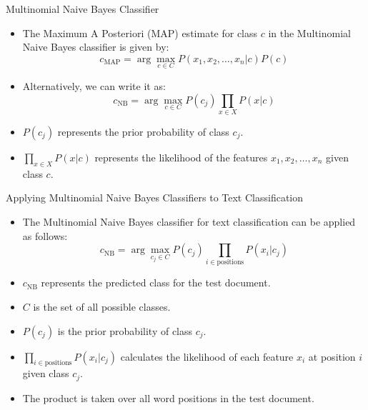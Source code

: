 \documentclass[handout]{beamer}
\begin{document}
\begin{frame}{Multinomial Naive Bayes Classifier}
\scriptsize
\begin{itemize}
    \item The Maximum A Posteriori (MAP) estimate for class $c$ in the Multinomial Naive Bayes classifier is given by:
    \[
    c_{\text{MAP}} = \arg\max_{c \in C} P(x_1, x_2, \ldots, x_n | c)P(c)
    \]
    \item Alternatively, we can write it as:
    \[
    c_{\text{NB}} = \arg\max_{c \in C} P(c_j) \prod_{x \in X} P(x | c)
    \]
    \item $P(c_j)$ represents the prior probability of class $c_j$.
    \item $\prod_{x \in X} P(x | c)$ represents the likelihood of the features $x_1, x_2, \ldots, x_n$ given class $c$.
\end{itemize}
\end{frame}

\begin{frame}{Applying Multinomial Naive Bayes Classifiers to Text Classification}
\scriptsize
\begin{itemize}
    \item The Multinomial Naive Bayes classifier for text classification can be applied as follows:
    \[
    c_{\text{NB}} = \arg\max_{c_j \in C} P(c_j) \prod_{i \in \text{positions}} P(x_i | c_j)
    \]
    \item $c_{\text{NB}}$ represents the predicted class for the test document.
    \item $C$ is the set of all possible classes.
    \item $P(c_j)$ is the prior probability of class $c_j$.
    \item $\prod_{i \in \text{positions}} P(x_i | c_j)$ calculates the likelihood of each feature $x_i$ at position $i$ given class $c_j$.
    \item The product is taken over all word positions in the test document.
\end{itemize}
\end{frame}
\end{document}
